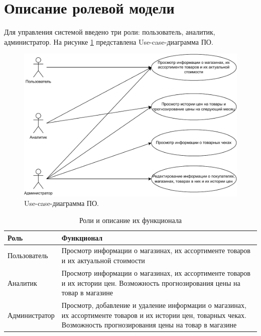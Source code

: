 \documentclass[a4paper,14pt]{extreport}
\begin{document}
\section{Описание ролевой модели}

Для управления системой введено три роли: пользователь, аналитик, администратор. На рисунке \ref{use_case} представлена Use-case-диаграмма ПО.

\captionsetup{singlelinecheck = false, justification=centering}
\begin{figure}[H]
	\centering
	\includegraphics[scale=0.8]{use_case.drawio.pdf}
	\caption{Use-case-диаграмма ПО.}
	\label{use_case}
\end{figure}

\captionsetup{singlelinecheck = false, justification=raggedright}
\begin{table}[H]
	\caption{Роли и описание их функционала}
	\begin{center}
		\begin{tabular}{| l | p{12 cm} |} 
			\hline
			
			\textbf{Роль} & \textbf{Функционал} \\  
			
			\hline
			
			Пользователь & Просмотр информации о магазинах, их ассортименте товаров и их актуальной стоимости \\
			
			\hline
			
			Аналитик & Просмотр информации о магазинах, их ассортименте товаров и их истории цен. Возможность прогнозирования цены на товар в магазине \\
			
			\hline
			
			Администратор & Просмотр, добавление и удаление информации о магазинах, их ассортименте товаров и их истории цен, товарных чеках. Возможность прогнозирования цены на товар в магазине \\
			
			\hline
		\end{tabular}
	\end{center}
\end{table}
\end{document}
